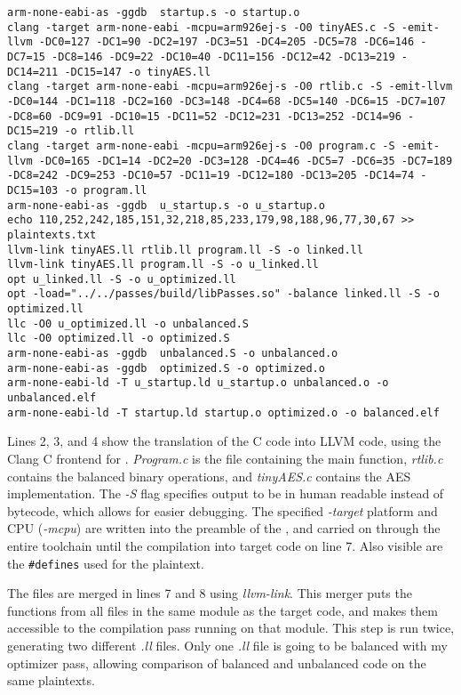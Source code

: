 \newpage
\begin{lstlisting}[caption=Output of the Makefile, label=lst:makefile-output]
arm-none-eabi-as -ggdb  startup.s -o startup.o
clang -target arm-none-eabi -mcpu=arm926ej-s -O0 tinyAES.c -S -emit-llvm -DC0=127 -DC1=90 -DC2=197 -DC3=51 -DC4=205 -DC5=78 -DC6=146 -DC7=15 -DC8=146 -DC9=22 -DC10=40 -DC11=156 -DC12=42 -DC13=219 -DC14=211 -DC15=147 -o tinyAES.ll
clang -target arm-none-eabi -mcpu=arm926ej-s -O0 rtlib.c -S -emit-llvm -DC0=144 -DC1=118 -DC2=160 -DC3=148 -DC4=68 -DC5=140 -DC6=15 -DC7=107 -DC8=60 -DC9=91 -DC10=15 -DC11=52 -DC12=231 -DC13=252 -DC14=96 -DC15=219 -o rtlib.ll
clang -target arm-none-eabi -mcpu=arm926ej-s -O0 program.c -S -emit-llvm -DC0=165 -DC1=14 -DC2=20 -DC3=128 -DC4=46 -DC5=7 -DC6=35 -DC7=189 -DC8=242 -DC9=253 -DC10=57 -DC11=19 -DC12=180 -DC13=205 -DC14=74 -DC15=103 -o program.ll
arm-none-eabi-as -ggdb  u_startup.s -o u_startup.o
echo 110,252,242,185,151,32,218,85,233,179,98,188,96,77,30,67 >> plaintexts.txt
llvm-link tinyAES.ll rtlib.ll program.ll -S -o linked.ll
llvm-link tinyAES.ll program.ll -S -o u_linked.ll
opt u_linked.ll -S -o u_optimized.ll
opt -load="../../passes/build/libPasses.so" -balance linked.ll -S -o optimized.ll
llc -O0 u_optimized.ll -o unbalanced.S
llc -O0 optimized.ll -o optimized.S
arm-none-eabi-as -ggdb  unbalanced.S -o unbalanced.o
arm-none-eabi-as -ggdb  optimized.S -o optimized.o
arm-none-eabi-ld -T u_startup.ld u_startup.o unbalanced.o -o unbalanced.elf
arm-none-eabi-ld -T startup.ld startup.o optimized.o -o balanced.elf
\end{lstlisting}

Lines 2, 3, and 4 show the translation of the C code into LLVM code, using the Clang\cite{lattner2008llvm} C frontend for \llvm{}.
\emph{Program.c} is the file containing the main function, \emph{rtlib.c} contains the balanced binary operations, and \emph{tinyAES.c} contains the AES implementation.
The \emph{-S} flag specifies output to be in human readable \ir{} instead of bytecode, which allows for easier debugging.
The specified \emph{-target} platform and CPU (\emph{-mcpu}) are written into the preamble of the \ir{}, and carried on through the entire toolchain until the compilation into target code on line 7.
Also visible are the \texttt{\#defines} used for the plaintext.

The \ir{} files are merged in lines 7 and 8 using \emph{llvm-link}.
This merger puts the functions from all files in the same module as the target code, and makes them accessible to the compilation pass running on that module.
This step is run twice, generating two different \emph{.ll} files.
Only one \emph{.ll} file is going to be balanced with my optimizer pass, allowing comparison of balanced and unbalanced code on the same plaintexts.

